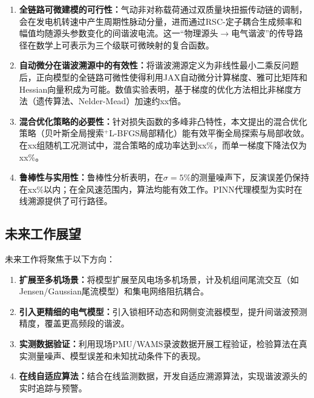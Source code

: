 \documentclass[withoutpreface,bwprint]{cumcmthesis}
\begin{document}
\begin{enumerate}

\item \textbf{全链路可微建模的可行性：}气动非对称载荷通过双质量块扭振传动链的调制，会在发电机转速中产生周期性脉动分量，进而通过RSC-定子耦合生成频率和幅值均随源头参数变化的间谐波电流。这一“物理源头$\to$电气谐波”的传导路径在数学上可表示为三个级联可微映射的复合函数。

\item \textbf{自动微分在谐波溯源中的有效性：}将谐波溯源定义为非线性最小二乘反问题后，正向模型的全链路可微性使得利用JAX自动微分计算梯度、雅可比矩阵和Hessian向量积成为可能。数值实验表明，基于梯度的优化方法相比非梯度方法（遗传算法、Nelder-Mead）加速约xx倍。

\item \textbf{混合优化策略的必要性：}针对损失函数的多峰非凸特性，本文提出的混合优化策略（贝叶斯全局搜索$^+$L-BFGS局部精化）能有效平衡全局探索与局部收敛。在xx组随机工况测试中，混合策略的成功率达到xx\%，而单一梯度下降法仅为xx\%。

\item \textbf{鲁棒性与实用性：}鲁棒性分析表明，在$\sigma=5\%$的测量噪声下，反演误差仍保持在xx\%以内；在全风速范围内，算法均能有效工作。PINN代理模型为实时在线溯源提供了可行路径。

\end{enumerate}

\subsection{未来工作展望}

未来工作将聚焦于以下方向：

\begin{enumerate}
\item \textbf{扩展至多机场景：}将模型扩展至风电场多机场景，计及机组间尾流交互（如Jensen/Gaussian尾流模型）和集电网络阻抗耦合。

\item \textbf{引入更精细的电气模型：}引入锁相环动态和网侧变流器模型，提升间谐波预测精度，覆盖更高频段的谐波。

\item \textbf{实测数据验证：}利用现场PMU/WAMS录波数据开展工程验证，检验算法在真实测量噪声、模型误差和未知扰动条件下的表现。

\item \textbf{在线自适应算法：}结合在线监测数据，开发自适应溯源算法，实现谐波源头的实时追踪与预警。
\end{enumerate}
\end{document}
